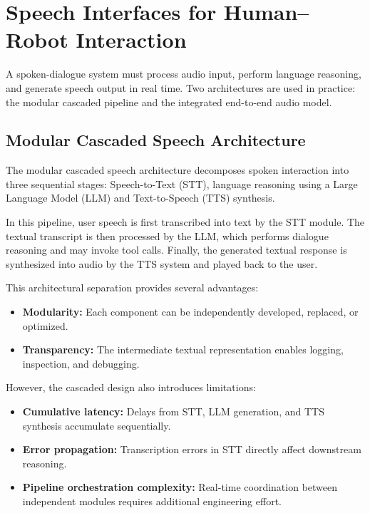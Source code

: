 \section{Speech Interfaces for Human--Robot Interaction}
\label{sec:multimodal_voice}

A spoken-dialogue system must process audio input, perform language reasoning, and generate speech output in real time.
Two architectures are used in practice: the modular cascaded pipeline and the integrated end-to-end audio model.

\subsection{Modular Cascaded Speech Architecture}

The modular cascaded speech architecture decomposes spoken interaction into three sequential stages:
Speech-to-Text (STT), language reasoning using a Large Language Model (LLM) and Text-to-Speech (TTS) synthesis.

In this pipeline, user speech is first transcribed into text by the STT module.
The textual transcript is then processed by the LLM, which performs dialogue reasoning and may invoke tool calls.
Finally, the generated textual response is synthesized into audio by the TTS system and played back to the user.

This architectural separation provides several advantages:

\begin{itemize}
    \item \textbf{Modularity:} Each component can be independently developed, replaced, or optimized.
    \item \textbf{Transparency:} The intermediate textual representation enables logging, inspection, and debugging.
    \end{itemize}

However, the cascaded design also introduces limitations:

\begin{itemize}
    \item \textbf{Cumulative latency:} Delays from STT, LLM generation, and TTS synthesis accumulate sequentially.
    \item \textbf{Error propagation:} Transcription errors in STT directly affect downstream reasoning.
    \item \textbf{Pipeline orchestration complexity:} Real-time coordination between independent modules requires additional engineering effort.
\end{itemize}

